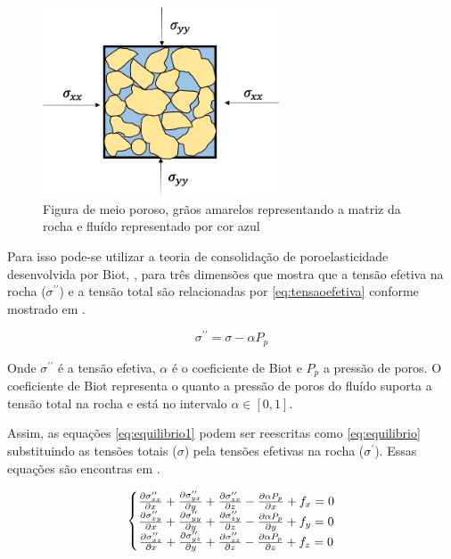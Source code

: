 \begin{figure}[!htbp]
\centering
\includegraphics[width=7cm]{chap01/figs/fluido_rocha_tensoes.png}
\caption{Figura de meio poroso, grãos amarelos representando a matriz da rocha e fluído representado por cor azul}
\label{fig:rochaComFluido}
\end{figure}

Para isso pode-se utilizar a teoria de consolidação de poroelasticidade desenvolvida por Biot,  \citet{}, para três dimensões que mostra que a tensão efetiva na rocha ($\sigma^{\prime\prime}$) e a tensão total são relacionadas por \eqref{eq:tensaoefetiva} conforme mostrado em \citet{ResGeomec}.

\begin{equation}
\label{eq:tensaoefetiva}
    \sigma^{\prime\prime} = \sigma - \alpha P_p
\end{equation}

Onde $\sigma^{\prime\prime}$ é a tensão efetiva, $\alpha$ é o coeficiente de Biot e $P_p$ a pressão de poros. O coeficiente de Biot representa o quanto a pressão de poros do fluído suporta a tensão total na rocha e está no intervalo $\alpha \in [0,1]$.

Assim, as equações \eqref{eq:equilibrio1} podem ser reescritas como \eqref{eq:equilibrio} substituindo as tensões totais ($\sigma$) pela tensões efetivas na rocha ($\sigma^\prime$). Essas equações são encontras em \cite{CompGeomec}.



\begin{equation}
\label{eq:equilibrio}
\left\{\begin{matrix}
\dx[\sxx]  + \dy[\syx] + \dz[\szx] - \dx[\alpha P_p] + f_x   = 0
\\
\dx[\sxy]  + \dy[\syy] + \dz[\szy] - \dy[\alpha P_p]  + f_y   = 0
\\
\dx[\sxz]  + \dy[\syz] + \dz[\szz] - \dz[\alpha P_p] + f_z   = 0
\end{matrix}\right.
\end{equation}

